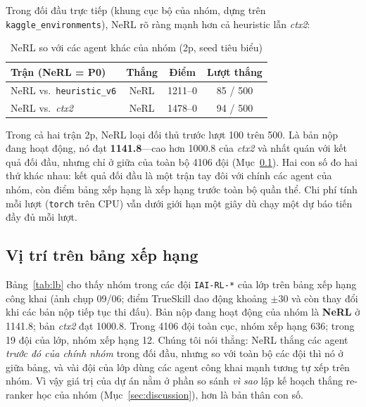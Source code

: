 \documentclass[conference]{IEEEtran}
\begin{document}
Trong đối đầu trực tiếp (khung cục bộ của nhóm, dựng trên \texttt{kaggle\_environments}), NeRL rõ ràng mạnh hơn cả heuristic lẫn \textit{ctx2}:

\begin{table}[htbp]
\caption{NeRL so với các agent khác của nhóm (2p, seed tiêu biểu)}
\label{tab:planner_h2h}
\centering
\begin{tabular}{lccc}
\toprule
\textbf{Trận (NeRL = P0)} & \textbf{Thắng} & \textbf{Điểm} & \textbf{Lượt thắng} \\
\midrule
NeRL vs.\ \texttt{heuristic\_v6} & NeRL & 1211--0 & 85 / 500 \\
NeRL vs.\ \textit{ctx2} & NeRL & 1478--0 & 94 / 500 \\
\bottomrule
\end{tabular}
\end{table}

Trong cả hai trận 2p, NeRL loại đối thủ trước lượt 100 trên 500. Là bản nộp đang hoạt động, nó đạt \textbf{1141.8}---cao hơn 1000.8 của \textit{ctx2} và nhất quán với kết quả đối đầu, nhưng chỉ ở giữa của toàn bộ 4106 đội (Mục~\ref{sec:lbstanding}). Hai con số đo hai thứ khác nhau: kết quả đối đầu là một trận tay đôi với chính các agent của nhóm, còn điểm bảng xếp hạng là xếp hạng trước toàn bộ quần thể. Chi phí tính mỗi lượt (\texttt{torch} trên CPU) vẫn dưới giới hạn một giây dù chạy một dự báo tiến đầy đủ mỗi lượt.

\subsection{Vị trí trên bảng xếp hạng}
\label{sec:lbstanding}
Bảng~\ref{tab:lb} cho thấy nhóm trong các đội \texttt{IAI-RL-*} của lớp trên bảng xếp hạng công khai (ảnh chụp 09/06; điểm TrueSkill dao động khoảng $\pm 30$ và còn thay đổi khi các bản nộp tiếp tục thi đấu). Bản nộp đang hoạt động của nhóm là \textbf{NeRL} ở 1141.8; bản \textit{ctx2} đạt 1000.8. Trong 4106 đội toàn cục, nhóm xếp hạng 636; trong 19 đội của lớp, nhóm xếp hạng 12. Chúng tôi nói thẳng: NeRL thắng các agent \emph{trước đó của chính nhóm} trong đối đầu, nhưng so với toàn bộ các đội thì nó ở giữa bảng, và vài đội của lớp dùng các agent công khai mạnh tương tự xếp trên nhóm. Vì vậy giá trị của dự án nằm ở phần so sánh \emph{vì sao} lập kế hoạch thắng re-ranker học của nhóm (Mục~\ref{sec:discussion}), hơn là bản thân con số.
\end{document}

